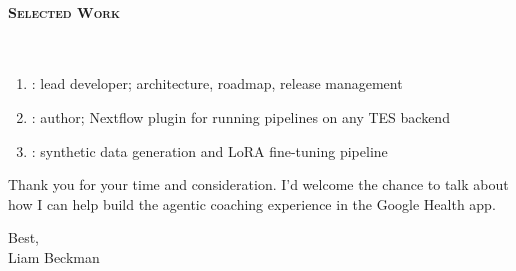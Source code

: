 \paragraph{\textsc{Selected Work}}\

\vspace*{0.3\baselineskip}

\begin{enumerate}[itemsep=0pt, topsep=1pt]

\item {}: lead developer; architecture, roadmap, release management

\item {}: author; Nextflow plugin for running pipelines on any TES backend

\item {}: synthetic data generation and LoRA fine-tuning pipeline

\end{enumerate}

\vspace*{0.3\baselineskip}

Thank you for your time and consideration. I'd welcome the chance to talk about how I can help build the agentic coaching experience in the Google Health app.

Best,\\

Liam Beckman

\vfill \myBreak{}



